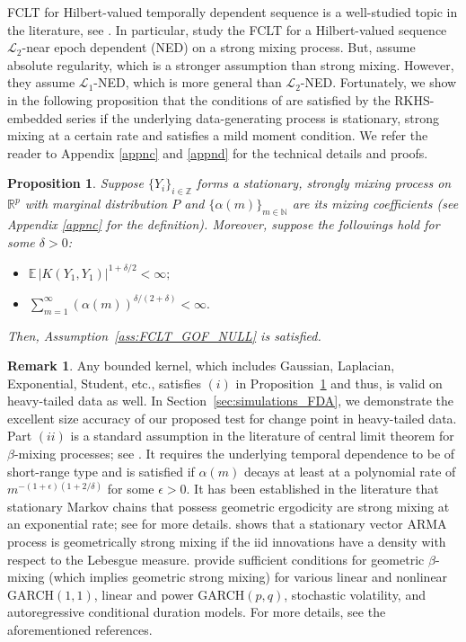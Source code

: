 \documentclass[11pt]{article}
\newcommand{\bE}{\mathbb{E}}
\theoremstyle{plain}
\newtheorem{proposition}{Proposition}
\theoremstyle{definition}
\newtheorem{remark}{Remark}
\theoremstyle{remark}
\begin{document}
FCLT for Hilbert-valued temporally dependent sequence is a well-studied topic in the literature, see \cite{chen1998central, sharipov2016sequential}. In particular, \cite{chen1998central} study the FCLT for a Hilbert-valued sequence $\mathcal{L}_2$-near epoch dependent (NED) on a strong mixing process. But, \cite{sharipov2016sequential} assume absolute regularity, which is a stronger assumption than strong mixing. However, they assume $\mathcal{L}_1$-NED, which is more general than $\mathcal{L}_2$-NED. Fortunately, we show in the following proposition that the conditions of \cite{chen1998central} are satisfied by the RKHS-embedded series if the underlying data-generating process is stationary, strong mixing at a certain rate and satisfies a mild moment condition. We refer the reader to Appendix \ref{appnc} and \ref{appnd} for the technical details and proofs.
\begin{proposition}\label{prop:FCLT_Verification_GOF_NULL}
    Suppose $\{Y_i\}_{i \in \mathbb{Z}}$ forms a stationary, strongly mixing process on $\mathbb{R}^p$ with marginal distribution $P$ and $\{\alpha(m)\}_{m \in \mathbb{N}}$ are its mixing coefficients (see Appendix \ref{appnc} for the definition). Moreover, suppose the followings hold for some $\delta>0$:
    \begin{itemize}
        \item [(i)]\(\bE\, |K(Y_1,Y_1)|^{1+\delta/2}<\infty;\)
        \item [(ii)] \(\sum_{m=1}^{\infty} (\alpha(m))^{\delta /(2+\delta)}<\infty.\)
    \end{itemize}
    Then, Assumption~\ref{ass:FCLT_GOF_NULL} is satisfied.
\end{proposition}
\begin{remark}
    Any bounded kernel, which includes Gaussian, Laplacian, Exponential, Student, etc., satisfies $(i)$ in Proposition~\ref{prop:FCLT_Verification_GOF_NULL} and thus, is valid on heavy-tailed data as well. In Section~\ref{sec:simulations_FDA}, we demonstrate the excellent size accuracy of our proposed test for change point in heavy-tailed data. Part $(ii)$ is a standard assumption in the literature of central limit theorem for $\beta$-mixing processes; see \cite{ibragimov1962some, dehling1983limit, doukhan1994mixing}. It requires the underlying temporal dependence to be of short-range type and is satisfied if $\alpha(m)$ decays at least at a polynomial rate of $m^{-(1+\epsilon)(1+2/\delta)}$ for some $\epsilon>0$. It has been established in the literature that stationary Markov chains that possess geometric ergodicity are strong mixing at an exponential rate; see \cite{bradley2005basic, meyn2012markov} for more details. \cite{mokkadem1988mixing} shows that a stationary vector ARMA process is geometrically strong mixing if the iid innovations have a density with respect to the Lebesgue measure. \cite{carrasco2002mixing} provide sufficient conditions for geometric $\beta$-mixing (which implies geometric strong mixing) for various linear and nonlinear GARCH$(1,1)$, linear and power GARCH$(p,q)$,
 stochastic volatility, and autoregressive conditional duration models. For more details, see the aforementioned references. 
\end{remark}
\end{document}
